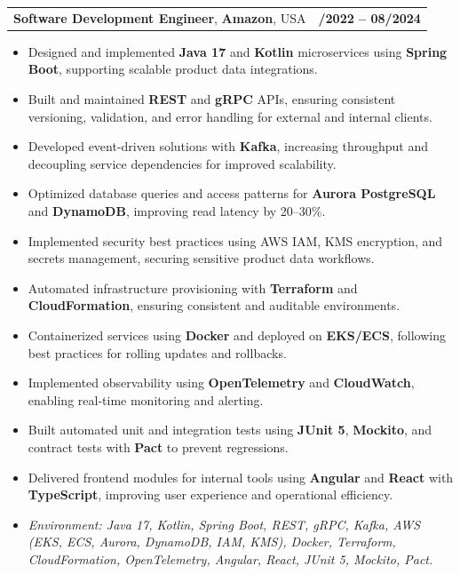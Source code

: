 \documentclass[letterpaper,11pt]{article}
\makeatletter
\newcommand{\resumeItem}[1]{
  \item\footnotesize{
    {#1 \vspace{-2pt}}
  }
}
\newcommand{\resumeSubheading}[4]{
  \vspace{-2pt}\item
    \begin{tabular*}{1.0\textwidth}[t]{l@{\extracolsep{\fill}}r}
      \textbf{\fontsize{10pt}{14pt}\selectfont #3}, \textbf{\fontsize{10pt}{14pt}\selectfont #1}, \fontsize{10pt}{14pt}\selectfont #4 & \textbf{\fontsize{10pt}{14pt}\selectfont #2} \\
    \end{tabular*}\vspace{-7pt}
}
\newcommand{\resumeItemListStart}{\begin{itemize}[leftmargin=*]}
\newcommand{\resumeItemListEnd}{\end{itemize}\vspace{-5pt}}
\makeatother
\begin{document}
\resumeSubheading
{Amazon}{10/2022 -- 08/2024}
{Software Development Engineer}{USA}
\resumeItemListStart
  \resumeItem{Designed and implemented \textbf{Java 17} and \textbf{Kotlin} microservices using \textbf{Spring Boot}, supporting scalable product data integrations.}
  \resumeItem{Built and maintained \textbf{REST} and \textbf{gRPC} APIs, ensuring consistent versioning, validation, and error handling for external and internal clients.}
  \resumeItem{Developed event-driven solutions with \textbf{Kafka}, increasing throughput and decoupling service dependencies for improved scalability.}
  \resumeItem{Optimized database queries and access patterns for \textbf{Aurora PostgreSQL} and \textbf{DynamoDB}, improving read latency by 20--30\%.}
  \resumeItem{Implemented security best practices using AWS IAM, KMS encryption, and secrets management, securing sensitive product data workflows.}
  \resumeItem{Automated infrastructure provisioning with \textbf{Terraform} and \textbf{CloudFormation}, ensuring consistent and auditable environments.}
  \resumeItem{Containerized services using \textbf{Docker} and deployed on \textbf{EKS/ECS}, following best practices for rolling updates and rollbacks.}
  \resumeItem{Implemented observability using \textbf{OpenTelemetry} and \textbf{CloudWatch}, enabling real-time monitoring and alerting.}
  \resumeItem{Built automated unit and integration tests using \textbf{JUnit 5}, \textbf{Mockito}, and contract tests with \textbf{Pact} to prevent regressions.}
  \resumeItem{Delivered frontend modules for internal tools using \textbf{Angular} and \textbf{React} with \textbf{TypeScript}, improving user experience and operational efficiency.}
  \resumeItem{\textit{Environment: Java 17, Kotlin, Spring Boot, REST, gRPC, Kafka, AWS (EKS, ECS, Aurora, DynamoDB, IAM, KMS), Docker, Terraform, CloudFormation, OpenTelemetry, Angular, React, JUnit 5, Mockito, Pact.}}
\resumeItemListEnd
\end{document}
